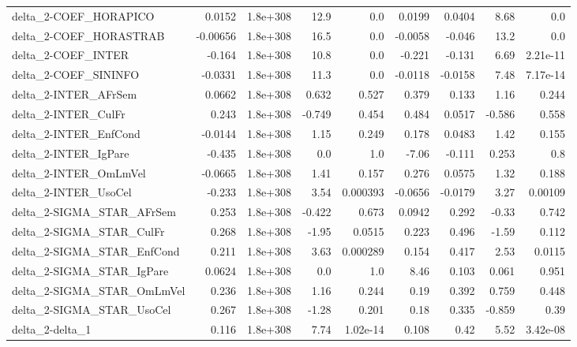 \begin{tabular}{lrrrrrrrr}
delta\_2-COEF\_HORAPICO                 &      0.0152 &     1.8e+308 &     12.9 &      0.0 &     0.0199 &      0.0404 &         8.68 &           0.0 \\
delta\_2-COEF\_HORASTRAB                &    -0.00656 &     1.8e+308 &     16.5 &      0.0 &    -0.0058 &      -0.046 &         13.2 &           0.0 \\
delta\_2-COEF\_INTER                    &      -0.164 &     1.8e+308 &     10.8 &      0.0 &     -0.221 &      -0.131 &         6.69 &      2.21e-11 \\
delta\_2-COEF\_SININFO                  &     -0.0331 &     1.8e+308 &     11.3 &      0.0 &    -0.0118 &     -0.0158 &         7.48 &      7.17e-14 \\
delta\_2-INTER\_AFrSem                  &      0.0662 &     1.8e+308 &    0.632 &    0.527 &      0.379 &       0.133 &         1.16 &         0.244 \\
delta\_2-INTER\_CulFr                   &       0.243 &     1.8e+308 &   -0.749 &    0.454 &      0.484 &      0.0517 &       -0.586 &         0.558 \\
delta\_2-INTER\_EnfCond                 &     -0.0144 &     1.8e+308 &     1.15 &    0.249 &      0.178 &      0.0483 &         1.42 &         0.155 \\
delta\_2-INTER\_IgPare                  &      -0.435 &     1.8e+308 &      0.0 &      1.0 &      -7.06 &      -0.111 &        0.253 &           0.8 \\
delta\_2-INTER\_OmLmVel                 &     -0.0665 &     1.8e+308 &     1.41 &    0.157 &      0.276 &      0.0575 &         1.32 &         0.188 \\
delta\_2-INTER\_UsoCel                  &      -0.233 &     1.8e+308 &     3.54 & 0.000393 &    -0.0656 &     -0.0179 &         3.27 &       0.00109 \\
delta\_2-SIGMA\_STAR\_AFrSem             &       0.253 &     1.8e+308 &   -0.422 &    0.673 &     0.0942 &       0.292 &        -0.33 &         0.742 \\
delta\_2-SIGMA\_STAR\_CulFr              &       0.268 &     1.8e+308 &    -1.95 &   0.0515 &      0.223 &       0.496 &        -1.59 &         0.112 \\
delta\_2-SIGMA\_STAR\_EnfCond            &       0.211 &     1.8e+308 &     3.63 & 0.000289 &      0.154 &       0.417 &         2.53 &        0.0115 \\
delta\_2-SIGMA\_STAR\_IgPare             &      0.0624 &     1.8e+308 &      0.0 &      1.0 &       8.46 &       0.103 &        0.061 &         0.951 \\
delta\_2-SIGMA\_STAR\_OmLmVel            &       0.236 &     1.8e+308 &     1.16 &    0.244 &       0.19 &       0.392 &        0.759 &         0.448 \\
delta\_2-SIGMA\_STAR\_UsoCel             &       0.267 &     1.8e+308 &    -1.28 &    0.201 &       0.18 &       0.335 &       -0.859 &          0.39 \\
delta\_2-delta\_1                       &       0.116 &     1.8e+308 &     7.74 & 1.02e-14 &      0.108 &        0.42 &         5.52 &      3.42e-08 \\
\bottomrule
\end{tabular}
